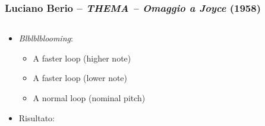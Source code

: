 \begin{frame}
    \frametitle{\normalsize Luciano Berio -- \emph{THEMA -- Omaggio a Joyce} (1958)} 

    \begin{columns}[T]
        \begin{column}{0.7\textwidth}
          \begin{itemize}
              \item \emph{Blblblblooming}:
      
                  \begin{itemize}
                      \item A faster loop (higher note)
                      \item A faster loop (lower note)
                      \item A normal loop (nominal pitch)
                  \end{itemize}
      
              \item Risultato: 
      
          \end{itemize}
        \end{column}
        \begin{column}{0.3\textwidth}
        \end{column}
    \end{columns}
        
\end{frame}
